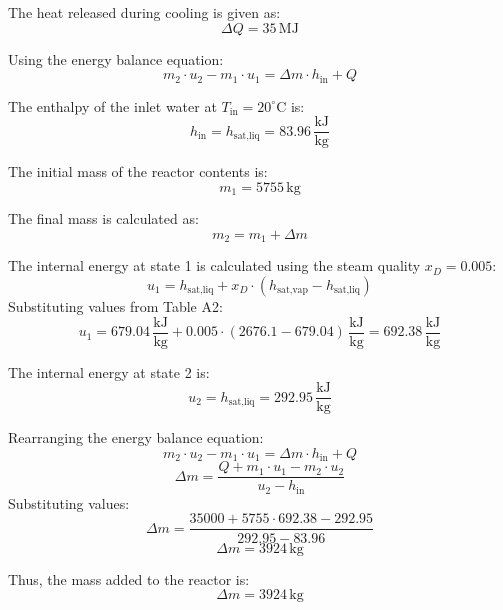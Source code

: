 The heat released during cooling is given as:  
\[
\Delta Q = 35 \, \text{MJ}
\]  

Using the energy balance equation:  
\[
m_2 \cdot u_2 - m_1 \cdot u_1 = \Delta m \cdot h_{\text{in}} + Q
\]  

The enthalpy of the inlet water at \( T_{\text{in}} = 20^\circ\text{C} \) is:  
\[
h_{\text{in}} = h_{\text{sat,liq}} = 83.96 \, \frac{\text{kJ}}{\text{kg}}
\]  

The initial mass of the reactor contents is:  
\[
m_1 = 5755 \, \text{kg}
\]  

The final mass is calculated as:  
\[
m_2 = m_1 + \Delta m
\]  

The internal energy at state 1 is calculated using the steam quality \( x_D = 0.005 \):  
\[
u_1 = h_{\text{sat,liq}} + x_D \cdot (h_{\text{sat,vap}} - h_{\text{sat,liq}})
\]  
Substituting values from Table A2:  
\[
u_1 = 679.04 \, \frac{\text{kJ}}{\text{kg}} + 0.005 \cdot (2676.1 - 679.04) \, \frac{\text{kJ}}{\text{kg}} = 692.38 \, \frac{\text{kJ}}{\text{kg}}
\]  

The internal energy at state 2 is:  
\[
u_2 = h_{\text{sat,liq}} = 292.95 \, \frac{\text{kJ}}{\text{kg}}
\]  

Rearranging the energy balance equation:  
\[
m_2 \cdot u_2 - m_1 \cdot u_1 = \Delta m \cdot h_{\text{in}} + Q
\]  
\[
\Delta m = \frac{Q + m_1 \cdot u_1 - m_2 \cdot u_2}{u_2 - h_{\text{in}}}
\]  
Substituting values:  
\[
\Delta m = \frac{35000 + 5755 \cdot 692.38 - 292.95}{292.95 - 83.96}
\]  
\[
\Delta m = 3924 \, \text{kg}
\]  

Thus, the mass added to the reactor is:  
\[
\Delta m = 3924 \, \text{kg}
\]